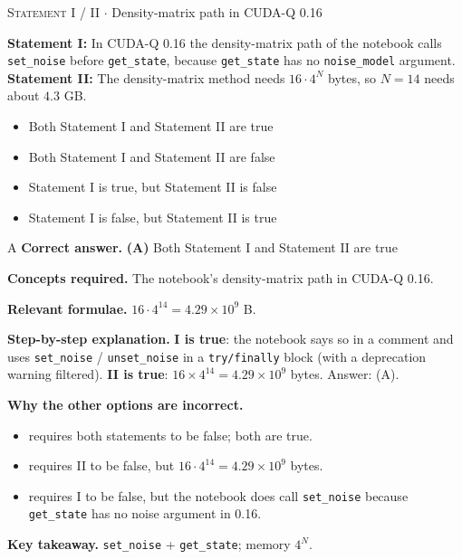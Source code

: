 \documentclass[11pt,a4paper]{article}
\newcommand{\optlabel}[1]{\textbf{(#1)}}
\newcommand{\correctlabel}[1]{\textcolor{okgreen}{\textbf{(#1)}\,\ding{51}}}
\newenvironment{qitem}[1]{\begin{list}{}{\setlength{\leftmargin}{3.3em}\setlength{\labelwidth}{3.1em}%
  \setlength{\labelsep}{0.2em}\setlength{\topsep}{3pt}\setlength{\parsep}{3pt}}\item[\textbf{Q.#1}\hfill]}{\end{list}}
\newcommand{\qsep}{\par\vspace{2pt}{\color{black!15}\hrule}\vspace{4pt}}
\newcommand{\qmeta}[2]{{\footnotesize\color{black!60}\textsc{#1} \;$\cdot$\; #2}\par}
\begin{document}
\begin{qitem}{58}
\qmeta{Statement I / II}{Density-matrix path in CUDA-Q 0.16}
\textbf{Statement I:} In CUDA-Q 0.16 the density-matrix path of the notebook calls \texttt{set\_noise} before \texttt{get\_state},
because \texttt{get\_state} has no \texttt{noise\_model} argument.\\[1mm]
\textbf{Statement II:} The density-matrix method needs $16\cdot4^N$ bytes, so $N = 14$ needs about $4.3$ GB.
\begin{itemize}[leftmargin=2.6em, labelsep=0.4em, itemsep=2pt, topsep=3pt]
\item[\correctlabel{A}] Both Statement I and Statement II are true
\item[\optlabel{B}] Both Statement I and Statement II are false
\item[\optlabel{C}] Statement I is true, but Statement II is false
\item[\optlabel{D}] Statement I is false, but Statement II is true
\end{itemize}
\end{qitem}
\begin{solbox}{A}
\textbf{\color{brand}Correct answer.} \textcolor{okgreen}{\textbf{(A)}} Both Statement I and Statement II are true

\textbf{\color{brand}Concepts required.} The notebook's density-matrix path in CUDA-Q 0.16.

\textbf{\color{brand}Relevant formulae.} $16\cdot4^{14} = 4.29\times10^9$ B.

\textbf{\color{brand}Step-by-step explanation.} \textbf{I is true}: the notebook says so in a comment and uses \texttt{set\_noise} / \texttt{unset\_noise} in a \texttt{try/finally} block (with a deprecation
warning filtered). \textbf{II is true}: $16\times4^{14} = 4.29\times10^9$ bytes. Answer: (A).

\textbf{\color{brand}Why the other options are incorrect.}
\begin{itemize}[leftmargin=2.4em, itemsep=1pt, topsep=2pt]
\item[\textbf{(B)}] requires both statements to be false; both are true.
\item[\textbf{(C)}] requires II to be false, but $16\cdot4^{14} = 4.29\times10^9$ bytes.
\item[\textbf{(D)}] requires I to be false, but the notebook does call \texttt{set\_noise} because \texttt{get\_state} has no noise argument in 0.16.
\end{itemize}
\textbf{\color{brand}Key takeaway.} \texttt{set\_noise} + \texttt{get\_state}; memory $4^N$.
\end{solbox}
\qsep
\end{document}
